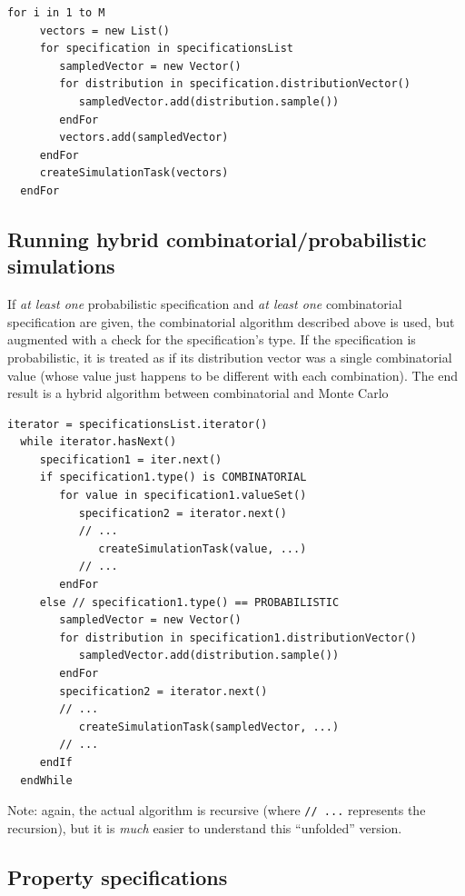 \documentclass{article}
\begin{document}
\begin{lstlisting}[]
  for i in 1 to M
     vectors = new List()
     for specification in specificationsList
        sampledVector = new Vector()
        for distribution in specification.distributionVector()
           sampledVector.add(distribution.sample())
        endFor
        vectors.add(sampledVector)
     endFor
     createSimulationTask(vectors)
  endFor
\end{lstlisting}

\subsection{Running hybrid combinatorial/probabilistic simulations}
\label{psl:hybrid}

If \textit{at least one} probabilistic specification and \textit{at least one}  combinatorial specification are given, the combinatorial algorithm described above is used, but augmented with a check for the specification's type. If the specification is probabilistic, it is treated as if its distribution vector was a single combinatorial value (whose value just happens to be different with each combination). The end result is a hybrid algorithm between combinatorial and Monte Carlo

\begin{lstlisting}[]
  iterator = specificationsList.iterator()
  while iterator.hasNext()
     specification1 = iter.next()
     if specification1.type() is COMBINATORIAL
        for value in specification1.valueSet()
           specification2 = iterator.next()
           // ...
              createSimulationTask(value, ...)
           // ...
        endFor
     else // specification1.type() == PROBABILISTIC
        sampledVector = new Vector()
        for distribution in specification1.distributionVector()
           sampledVector.add(distribution.sample())
        endFor
        specification2 = iterator.next()
        // ...
           createSimulationTask(sampledVector, ...)
        // ...
     endIf 
  endWhile
\end{lstlisting}

\begin{sideblock}
Note: again, the actual algorithm is recursive (where {\tt // ...} represents the recursion), but it is \textit{much} easier to understand this ``unfolded'' version.
\end{sideblock}

\subsection{Property specifications}
\end{document}
